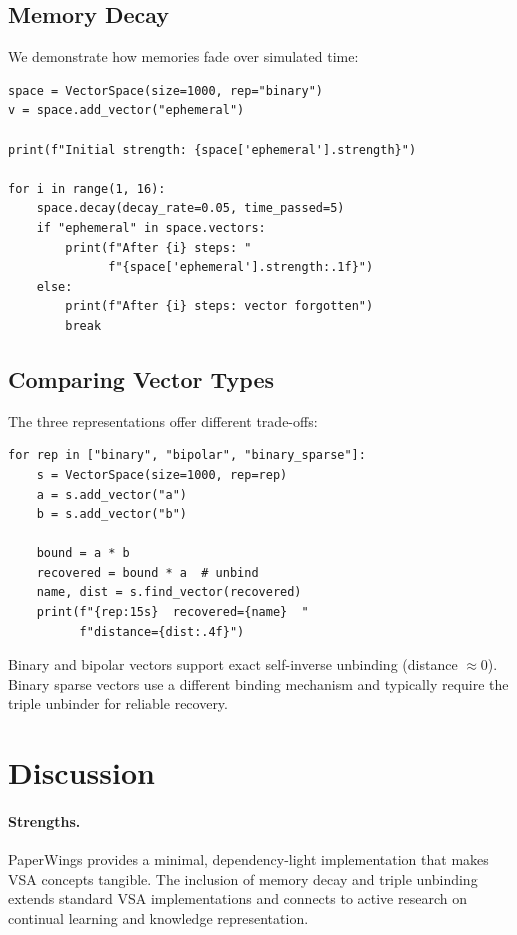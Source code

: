 \documentclass[11pt]{article}
\begin{document}
\subsection{Memory Decay}

We demonstrate how memories fade over simulated time:

\begin{lstlisting}[caption={Exponential memory decay.}]
space = VectorSpace(size=1000, rep="binary")
v = space.add_vector("ephemeral")

print(f"Initial strength: {space['ephemeral'].strength}")

for i in range(1, 16):
    space.decay(decay_rate=0.05, time_passed=5)
    if "ephemeral" in space.vectors:
        print(f"After {i} steps: "
              f"{space['ephemeral'].strength:.1f}")
    else:
        print(f"After {i} steps: vector forgotten")
        break
\end{lstlisting}

\subsection{Comparing Vector Types}

The three representations offer different trade-offs:

\begin{lstlisting}[caption={Binding and unbinding across vector types.}]
for rep in ["binary", "bipolar", "binary_sparse"]:
    s = VectorSpace(size=1000, rep=rep)
    a = s.add_vector("a")
    b = s.add_vector("b")

    bound = a * b
    recovered = bound * a  # unbind
    name, dist = s.find_vector(recovered)
    print(f"{rep:15s}  recovered={name}  "
          f"distance={dist:.4f}")
\end{lstlisting}

\noindent Binary and bipolar vectors support exact self-inverse unbinding (distance $\approx 0$). Binary sparse vectors use a different binding mechanism and typically require the triple unbinder for reliable recovery.

\section{Discussion}

\paragraph{Strengths.} PaperWings provides a minimal, dependency-light implementation that makes VSA concepts tangible. The inclusion of memory decay and triple unbinding extends standard VSA implementations and connects to active research on continual learning and knowledge representation.
\end{document}
